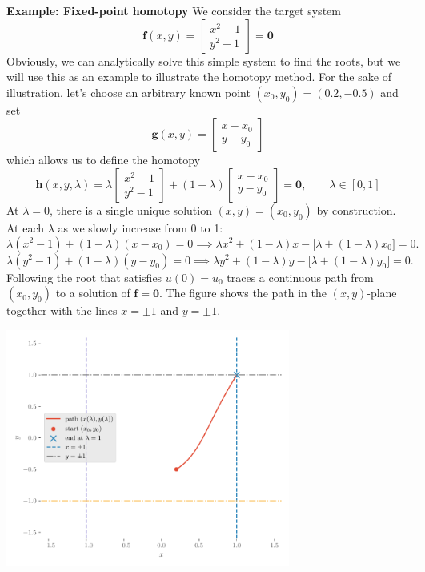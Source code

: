 \begin{exampleBox}
    \textbf{Example: Fixed-point homotopy}
    We consider the target system
    \[
    \mathbf f(x,y)=
    \begin{bmatrix}
    x^2-1\\
    y^2-1
    \end{bmatrix}=\mathbf 0
    \]
    Obviously, we can analytically solve this simple system to find the roots, but we will use this as an example to illustrate the homotopy method. For the sake of illustration, let's choose an arbitrary known point \((x_0,y_0)=(0.2,-0.5)\) and set
    \[
    \mathbf g(x,y)=
    \begin{bmatrix}
    x-x_0\\
    y-y_0
    \end{bmatrix}
    \]
    which allows us to define the homotopy
    \[
    \mathbf h(x,y,\lambda)
    =\lambda
    \begin{bmatrix}
    x^2-1\\ y^2-1
    \end{bmatrix}
    +(1-\lambda)
    \begin{bmatrix}
    x-x_0\\ y-y_0
    \end{bmatrix}
    =\mathbf 0,\qquad \lambda\in[0,1]
    \]
    At \(\lambda=0\), there is a single unique solution \((x,y)=(x_0,y_0)\) by construction. At each \(\lambda\) as we slowly increase from 0 to 1:
    \[
    \lambda(x^2-1)+(1-\lambda)(x-x_0)=0
    \implies
    \lambda x^2+(1-\lambda)x-\big[\lambda+(1-\lambda)x_0\big]=0.
    \]
    \[
    \lambda(y^2-1)+(1-\lambda)(y-y_0)=0
    \implies
    \lambda y^2+(1-\lambda)y-\big[\lambda+(1-\lambda)y_0\big]=0.
    \]
    Following the root that satisfies \(u(0)=u_0\) traces a continuous path from \((x_0,y_0)\) to a solution of \(\mathbf f=\mathbf 0\).
    The figure shows the path in the \((x,y)\)-plane together with the lines \(x=\pm1\) and \(y=\pm1\).

    \begin{center}
        \includegraphics[width=0.7\textwidth]{figs/nle/fixed_point_path.pdf}
    \end{center}

\end{exampleBox}


